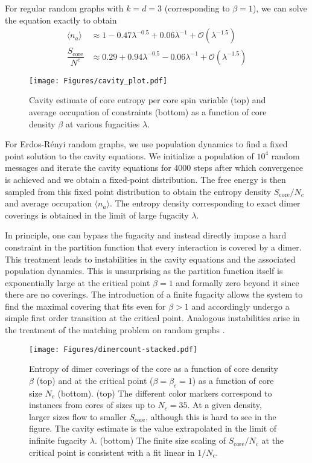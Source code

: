 \documentclass[aps,pra,twocolumn,superscriptaddress,amsmath]{revtex4-1}
\newcommand{\Sc}{S_{\mathrm{core}}}
\begin{document}
\begin{widetext}
For regular random graphs with $k = d = 3$ (corresponding to $\beta = 1$), we can solve the equation exactly to obtain
%
\begin{align}
\langle n_{a}\rangle & \approx1-0.47\lambda^{-0.5}+0.06\lambda^{-1}+\mathcal{O}\left(\lambda^{-1.5}\right) \\
\dfrac{\Sc}{N^{c}} & \approx0.29+0.94\lambda^{-0.5}-0.06\lambda^{-1}+\mathcal{O}\left(\lambda^{-1.5}\right)
\end{align}

\end{widetext}

\begin{figure}
\texttt{[image: Figures/cavity\_plot.pdf]}
	\caption{\label{fig:cavity_result} 
    Cavity estimate of core entropy per core spin variable (top) and average occupation of constraints (bottom) as a function of core density $\beta$ at various fugacities $\lambda$. 
}
\end{figure}

For Erdos-R\'enyi random graphs, we use population dynamics to find a fixed point solution to the cavity equations. We initialize a population of $10^4$ random messages and iterate the cavity equations for $4000$ steps after which convergence is achieved and we obtain a fixed-point distribution. 
The free energy is then sampled from this fixed point distribution to obtain the entropy density $\Sc/N_c$ and average occupation $\langle n_a \rangle$. The entropy density corresponding to exact dimer coverings is obtained in the limit of large fugacity $\lambda$.

In principle, one can bypass the fugacity and instead directly impose a hard constraint in the partition function that every interaction is covered by a dimer. 
This treatment leads to instabilities in the cavity equations and the associated population dynamics. 
This is unsurprising as the partition function itself is exponentially large at the critical point $\beta = 1$ and formally zero beyond it since there are no coverings. 
The introduction of a finite fugacity allows the system to find the maximal covering that fits even for $\beta > 1$ and accordingly undergo a simple first order transition at the critical point.
Analogous instabilities arise in the treatment of the matching problem on random graphs \cite{Zdeborova:2006aa}.

\begin{figure}
 \texttt{[image: Figures/dimercount-stacked.pdf]}
	\caption{\label{fig:results} Entropy of dimer coverings of the core as a function of core density $\beta$ (top) and at the critical point ($\beta = \beta_c = 1$) as a function of core size $N_c$ (bottom). 
    (top) The different color markers correspond to instances from cores of sizes up to $N_c = 35$. At a given density, larger sizes flow to smaller $\Sc$, although this is hard to see in the figure. The cavity estimate is the value extrapolated in the limit of infinite fugacity $\lambda$.
    (bottom) The finite size scaling of $\Sc/N_c$ at the critical point is consistent with a fit linear in $1/N_c$. 
 }
\end{figure}
\end{document}
